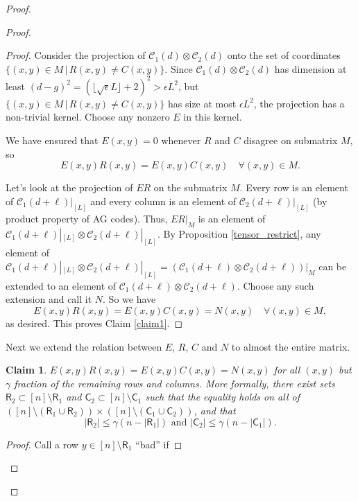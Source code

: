 \documentclass[11pt]{article}
\newcommand{\C}{\mathcal{C}}
\newtheorem{claim}[theorem]{Claim}
\newcommand{\gnote}[1]{{\color{red} [Gabe: #1]}}
\newcommand{\gnote}[1]{}
\newcommand{\Row}{\mathsf{R}}
\newcommand{\Col}{\mathsf{C}}
\renewcommand{\d}{d}
\begin{document}
\begin{proof}
\begin{proof}
\begin{proof}
Consider the projection of $\C_1(\d)\otimes \C_2(\d)$ onto the set of coordinates $\{(x,y) \in M \,|\, R(x,y) \neq C(x,y)\}$. Since $\C_1(\d)\otimes \C_2(\d)$ has dimension at least $(\d-g)^2 = (\lfloor \sqrt{\epsilon}L\rfloor + 2)^2 > \epsilon L^2$, but $\{(x,y) \in M \,|\, R(x,y) \neq C(x,y)\}$ has size at most $\epsilon L^2$, the projection has a non-trivial kernel. Choose any nonzero $E$ in this kernel. %

We have ensured that $E(x,y) = 0$ whenever $R$ and $C$ disagree on submatrix $M$, so
$$E(x,y)R(x,y) = E(x,y)C(x,y) \quad \forall (x,y) \in M.$$

Let's look at the projection of $ER$ on the submatrix $M$. Every row is an element of $\C_1(\d + \ell)|_{[L]}$ and every column is an element of $\C_2(\d + \ell)|_{[L]}$ (by product property of AG codes). Thus, $ER|_M$ is an element of $\C_1(\d + \ell)|_{[L]} \otimes \C_2(\d + \ell)|_{[L]}$. By Proposition \ref{tensor_restrict}, any element of $\C_1(\d + \ell)|_{[L]} \otimes \C_2(\d + \ell)|_{[L]} = (\C_1(\d + \ell) \otimes \C_2(\d + \ell))|_M$ can be extended to an element of $\C_1(\d + \ell) \otimes \C_2(\d + \ell)$. Choose any such extension and call it $N$. So we have
$$E(x,y)R(x,y) = E(x,y)C(x,y) = N(x,y) \quad \forall (x,y) \in M,$$
as desired. This proves Claim \ref{claim1}.
\end{proof}
Next we extend the relation between $E$, $R$, $C$ and $N$ to almost the entire matrix.

\begin{claim}
\label{claim2}
$E(x,y)R(x,y)=E(x,y)C(x,y)=N(x,y)$ for all  $(x,y)$ but $\gamma$ fraction of the remaining rows and columns. More formally, there exist sets $\Row_2 \subset [n] \setminus \Row_1$ and $\Col_2 \subset [n] \setminus \Col_1$ such that the equality holds on all of $([n] \setminus (\Row_1 \cup \Row_2)) \times ([n] \setminus (\Col_1 \cup \Col_2))$, and  that $$|\Row_2| \leq \gamma (n- |\Row_1|) \text{ and } |\Col_2| \leq \gamma (n- |\Col_1|).$$
\end{claim}

\begin{proof}
Call a row $y \in [n] \setminus \Row_1$ ``bad'' if


\end{proof}
\end{proof}
\end{proof}
\end{document}
